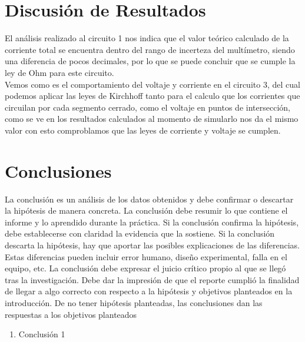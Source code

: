 \documentclass[osajnl,showpacs,superscriptaddress,10pt]{article}
\begin{document}
\begin{multicols}{2}
        


\section{Discusión de Resultados}

   El análisis realizado al circuito 1 nos indica que el valor teórico calculado de la corriente total se encuentra dentro del rango de incerteza del multímetro, siendo una diferencia de pocos decimales, por lo que se puede concluir que se cumple la ley de Ohm para este circuito. \\
   
   Vemos como es el comportamiento del voltaje y corriente en el circuito 3, del cual podemos aplicar las leyes de Kirchhoff tanto para el calculo que los corrientes que circuilan por cada segmento cerrado, como el voltaje en puntos de intersección, como se ve en los resultados calculados al momento de simularlo nos da el mismo valor con esto comproblamos que las leyes de corriente y voltaje se cumplen. 


    

\section{Conclusiones}

La conclusión es un análisis de los datos obtenidos y debe confirmar o descartar la hipótesis de
manera concreta. La conclusión debe resumir lo que contiene el informe y lo aprendido
durante la práctica. Si la conclusión confirma la hipótesis, debe establecerse con claridad la
evidencia que la sostiene. Si la conclusión descarta la hipótesis, hay que aportar las posibles
explicaciones de las diferencias. Estas diferencias pueden incluir error humano, diseño
experimental, falla en el equipo, etc.
La conclusión debe expresar el juicio crítico propio al que se llegó tras la investigación. Debe
dar la impresión de que el reporte cumplió la finalidad de llegar a algo correcto con respecto a
la hipótesis y objetivos planteados en la introducción.
De no tener hipótesis planteadas, las conclusiones dan las respuestas a los objetivos planteados


\begin{enumerate}
\item Conclusión 1


\end{enumerate}
\end{multicols}
\end{document}
